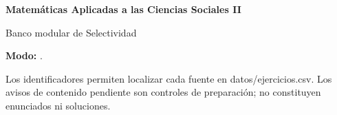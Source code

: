 \documentclass[11pt,a4paper]{article}
\begin{document}
\begin{center}
  {\Large\bfseries Matemáticas Aplicadas a las Ciencias Sociales II}\par
  \medskip
  {\large Banco modular de Selectividad}\par
  \smallskip
  \TituloSeleccion
\end{center}

\noindent\textbf{Modo:} \EtiquetaModo.\par
\noindent\small Los identificadores permiten localizar cada fuente en
\textnormal{datos/ejercicios.csv}. Los avisos de contenido pendiente son controles
de preparación; no constituyen enunciados ni soluciones.\normalsize
\medskip

\ContextoSeleccion
\MostrarSeleccion
\end{document}
